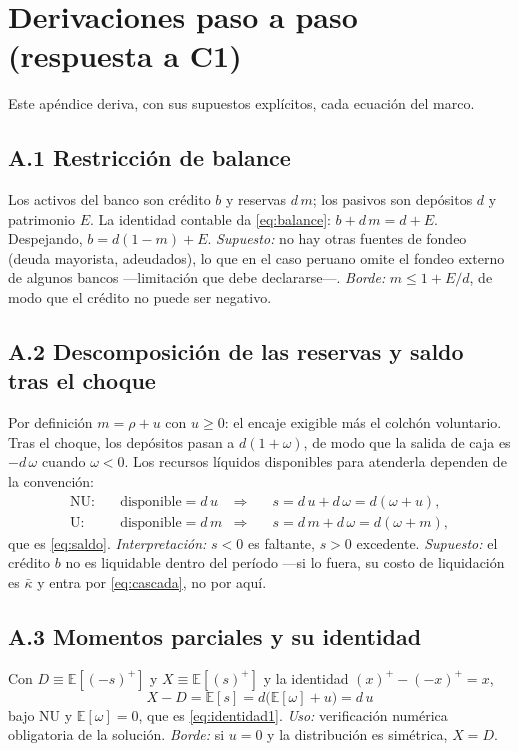 \documentclass[11pt]{article}
\newcommand{\E}{\mathbb{E}}
\theoremstyle{definition}
\begin{document}
\appendix
\section{Derivaciones paso a paso (respuesta a C1)}\label{sec:derivaciones}

Este ap\'endice deriva, con sus supuestos expl\'icitos, cada ecuaci\'on del marco.

\subsection*{A.1 Restricci\'on de balance}
Los activos del banco son cr\'edito $b$ y reservas $d\,m$; los pasivos son
dep\'ositos $d$ y patrimonio $E$. La identidad contable da
\eqref{eq:balance}: $b+d\,m=d+E$. Despejando,
$b=d(1-m)+E$. \emph{Supuesto:} no hay otras fuentes de fondeo (deuda mayorista,
adeudados), lo que en el caso peruano omite el fondeo externo de algunos bancos
---limitaci\'on que debe declararse---. \emph{Borde:} $m\le1+E/d$, de modo que el
cr\'edito no puede ser negativo.

\subsection*{A.2 Descomposici\'on de las reservas y saldo tras el choque}
Por definici\'on $m=\rho+u$ con $u\ge0$: el encaje exigible m\'as el colch\'on
voluntario. Tras el choque, los dep\'ositos pasan a $d(1+\omega)$, de modo que la
salida de caja es $-d\,\omega$ cuando $\omega<0$. Los recursos l\'iquidos
disponibles para atenderla dependen de la convenci\'on:
\begin{align*}
\text{NU:}&\quad \text{disponible}=d\,u
&\Longrightarrow&\quad s=d\,u+d\,\omega=d(\omega+u),\\
\text{U:}&\quad \text{disponible}=d\,m
&\Longrightarrow&\quad s=d\,m+d\,\omega=d(\omega+m),
\end{align*}
que es \eqref{eq:saldo}. \emph{Interpretaci\'on:} $s<0$ es faltante, $s>0$
excedente. \emph{Supuesto:} el cr\'edito $b$ no es liquidable dentro del per\'iodo
---si lo fuera, su costo de liquidaci\'on es $\bar\kappa$ y entra por
\eqref{eq:cascada}, no por aqu\'i.

\subsection*{A.3 Momentos parciales y su identidad}
Con $D\equiv\E[(-s)^+]$ y $X\equiv\E[(s)^+]$ y la identidad
$(x)^+-(-x)^+=x$,
\[
X-D=\E[s]=d\big(\E[\omega]+u\big)=d\,u
\]
bajo NU y $\E[\omega]=0$, que es \eqref{eq:identidad1}. \emph{Uso:} verificaci\'on
num\'erica obligatoria de la soluci\'on. \emph{Borde:} si $u=0$ y la distribuci\'on
es sim\'etrica, $X=D$.
\end{document}
